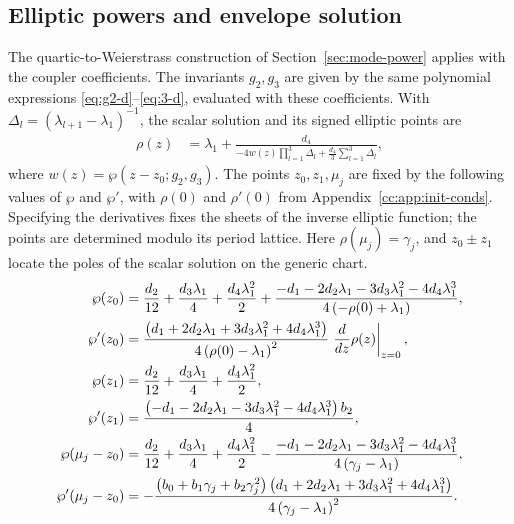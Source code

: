 \documentclass[11pt,a4paper]{article}
\numberwithin{equation}{section}
\begin{document}
\subsection{Elliptic powers and envelope solution}\label{cc:sec:mode-power}
The quartic-to-Weierstrass construction of Section~\ref{sec:mode-power} applies with the coupler coefficients.
The invariants $g_2,g_3$ are given by the same polynomial expressions \eqref{eq:g2-d}--\eqref{eq:3-d}, evaluated with these coefficients.
With $\Delta_l=(\lambda_{l+1}-\lambda_1)^{-1}$, the scalar solution and its signed elliptic points are
\begin{align}
\rho{\left(z \right)} &= {\lambda}_{1} + \frac{d_4}{- 4 w{\left(z \right)} \prod_{l=1}^{3} {\Delta}_{l}  + \frac{d_4}{3} \sum_{l=1}^{3} {\Delta}_{l} }, \label{cc:eq:rho-wp-1}
\end{align}
where $w(z)=\wp(z-z_0;g_2,g_3)$.
The points $z_0,z_1,\mu_j$ are fixed by the following values of $\wp$ and $\wp'$, with $\rho(0)$ and $\rho'(0)$ from Appendix~\ref{cc:app:init-conds}.
Specifying the derivatives fixes the sheets of the inverse elliptic function; the points are determined modulo its period lattice.
Here $\rho(\mu_j)=\gamma_j$, and $z_0\pm z_1$ locate the poles of the scalar solution on the generic chart.
\begin{align}
\wp{\left(z_{0}\right)} &= \frac{{d}_{2}}{12} + \frac{{d}_{3} {\lambda}_{1}}{4} + \frac{{d}_{4} {\lambda}_{1}^{2}}{2} + \frac{- {d}_{1} - 2 {d}_{2} {\lambda}_{1} - 3 {d}_{3} {\lambda}_{1}^{2} - 4 {d}_{4} {\lambda}_{1}^{3}}{4 \left(- \rho{\left(0 \right)} + {\lambda}_{1}\right)}, \notag \\
\wp'{\left(z_{0}\right)} &= \frac{\left({d}_{1} + 2 {d}_{2} {\lambda}_{1} + 3 {d}_{3} {\lambda}_{1}^{2} + 4 {d}_{4} {\lambda}_{1}^{3}\right) }{4 \left(\rho{\left(0 \right)} - {\lambda}_{1}\right)^{2}}\left. \frac{d}{d z} \rho{\left(z \right)} \right|_{\substack{ z=0 }}, \notag \\
\wp{\left(z_{1}\right)} &= \frac{{d}_{2}}{12} + \frac{{d}_{3} {\lambda}_{1}}{4} + \frac{{d}_{4} {\lambda}_{1}^{2}}{2}, \notag \\
\wp'{\left(z_{1}\right)} &= \frac{\left(- {d}_{1} - 2 {d}_{2} {\lambda}_{1} - 3 {d}_{3} {\lambda}_{1}^{2} - 4 {d}_{4} {\lambda}_{1}^{3}\right) b_2}{4}, \notag \\
\wp{\left({\mu}_{j} - z_{0}\right)} &= \frac{{d}_{2}}{12} + \frac{{d}_{3} {\lambda}_{1}}{4} + \frac{{d}_{4} {\lambda}_{1}^{2}}{2} - \frac{- {d}_{1} - 2 {d}_{2} {\lambda}_{1} - 3 {d}_{3} {\lambda}_{1}^{2} - 4 {d}_{4} {\lambda}_{1}^{3}}{4 \left({\gamma}_{j} - {\lambda}_{1}\right)}, \notag \\
\wp'{\left({\mu}_{j}- z_{0}\right)} &= - \frac{\left({b}_{0} + {b}_{1} {\gamma}_{j} + {b}_{2} {\gamma}_{j}^{2}\right) \left({d}_{1} + 2 {d}_{2} {\lambda}_{1} + 3 {d}_{3} {\lambda}_{1}^{2} + 4 {d}_{4} {\lambda}_{1}^{3}\right)}{4 \left({\gamma}_{j} - {\lambda}_{1}\right)^{2}}. \label{cc:eq:wp-points}
\end{align}
\end{document}
